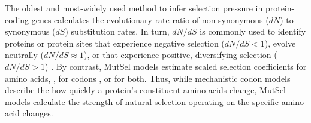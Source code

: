 \documentclass[11pt]{article}
\begin{document}




The oldest and most-widely used method to infer selection pressure in protein-coding genes calculates the evolutionary rate ratio of non-synonymous ($dN$) to synonymous ($dS$) substitution rates. In turn, $dN/dS$ is commonly used to identify proteins or protein sites that experience negative selection ($dN/dS<1$), evolve neutrally ($dN/dS\approx1$), or that experience positive, diversifying selection ($dN/dS>1$) \cite{NielsenYang1998,Yangetal2000, KosakovskyPondFrost2005}. By contrast, MutSel models estimate scaled selection coefficients for amino acids, \cite{HalpernBruno1998,YangNielsen2008,Rodrigueetal2010,Tamurietal2012,Tamurietal2014}, for codons \cite{YangNielsen2008}, or for both. Thus, while mechanistic codon models describe the how quickly a protein's constituent amino acids change, MutSel models calculate the strength of natural selection operating on the specific amino-acid changes.  
\end{document}
